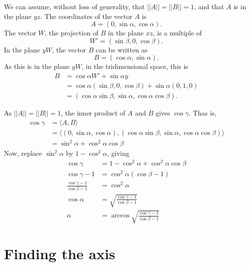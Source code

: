 \documentclass{article}
\begin{document}
We can assume, without loss of generality,
that $||A|| = ||B|| = 1$,
and that $A$ is in the plane $yz$.
The coordinates of the vector $A$ is
\begin{equation*}
    A = (0, \sin \alpha, \cos \alpha).
\end{equation*}
The vector $W$, the projection of $B$ in the plane $xz$,
is a multiple of
\begin{equation*}
    W' = (\sin \beta, 0, \cos \beta).
\end{equation*}
In the plane $yW$, the vector $B$ can be written as
\begin{equation*}
    B = (\cos \alpha, \sin \alpha).
\end{equation*}
As this is in the plane $yW$, in the tridimensional space,
this is
\begin{align*}
    B &= \cos \alpha W' + \sin \alpha y \\
      &= \cos \alpha (\sin \beta, 0, \cos \beta) + \sin \alpha (0, 1, 0) \\
      &= (\cos \alpha \sin \beta, \sin \alpha, \cos \alpha \cos \beta).
\end{align*}

As $||A|| = ||B|| = 1$, the inner product of $A$ and $B$ gives $\cos \gamma$.
Thas is,
\begin{align*}
    \cos \gamma &= \langle A, B \rangle \\
                &= \langle (0, \sin \alpha, \cos \alpha),
            (\cos \alpha \sin \beta, \sin \alpha, \cos \alpha \cos \beta) \rangle \\
                &= \sin^2 \alpha + \cos^2 \alpha \cos \beta
\end{align*}
Now, replace $\sin^2 \alpha$ by $1 - \cos^2 \alpha$, giving
\begin{align*}
    \cos \gamma &= 1 - \cos^2 \alpha + \cos^2 \alpha \cos \beta \\
    \cos \gamma - 1 &= \cos^2 \alpha( \cos \beta - 1 ) \\
    \frac{\cos \gamma - 1}{\cos \beta - 1} &= \cos^2 \alpha \\
    \cos \alpha &= \sqrt{\frac{\cos \gamma - 1}{\cos \beta - 1}} \\
    \alpha &= \arccos \sqrt{\frac{\cos \gamma - 1}{\cos \beta - 1}}
\end{align*}

\section{Finding the axis}
\end{document}
